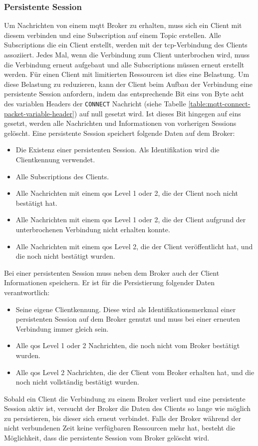 \subsubsection{Persistente Session} \label{s:persistent-session}
Um Nachrichten von einem \ac{mqtt} Broker zu erhalten, muss sich ein Client mit diesem verbinden und eine Subscription auf einem Topic erstellen. Alle Subscriptions die ein Client erstellt, werden mit der \ac{tcp}-Verbindung des Clients assoziiert.
Jedes Mal, wenn die Verbindung zum Client unterbrochen wird, muss die Verbindung erneut aufgebaut und alle Subscriptions müssen erneut erstellt werden.
Für einen Client mit limitierten Ressourcen ist dies eine Belastung.
Um diese Belastung zu reduzieren, kann der Client beim Aufbau der Verbindung eine persistente Session anfordern, indem das entsprechende Bit eins von Byte acht des variablen Headers der \verb|CONNECT| Nachricht (siehe Tabelle \ref{table:mqtt-connect-packet-variable-header}) auf null gesetzt wird.
Ist dieses Bit hingegen auf eins gesetzt, werden alle Nachrichten und Informationen von vorherigen Sessions gelöscht.
Eine persistente Session speichert folgende Daten auf dem Broker:
\begin{itemize}
    \item Die Existenz einer persistenten Session. Als Identifikation wird die Clientkennung verwendet.
    \item Alle Subscriptions des Clients.
    \item Alle Nachrichten mit einem \ac{qos} Level 1 oder 2, die der Client noch nicht bestätigt hat.
    \item Alle Nachrichten mit einem \ac{qos} Level 1 oder 2, die der Client aufgrund der unterbrochenen Verbindung nicht erhalten konnte.
    \item Alle Nachrichten mit einem \ac{qos} Level 2, die der Client veröffentlicht hat, und die noch nicht bestätigt wurden.
\end{itemize}
Bei einer persistenten Session muss neben dem Broker auch der Client Informationen speichern.
Er ist für die Persistierung folgender Daten verantwortlich:
\begin{itemize}
    \item Seine eigene Clientkennung. Diese wird als Identifikationsmerkmal einer persistenten Session auf dem Broker genutzt und muss bei einer erneuten Verbindung immer gleich sein.
    \item Alle \ac{qos} Level 1 oder 2 Nachrichten, die noch nicht vom Broker bestätigt wurden.
    \item Alle \ac{qos} Level 2 Nachrichten, die der Client vom Broker erhalten hat, und die noch nicht vollständig bestätigt wurden.
\end{itemize}
Sobald ein Client die Verbindung zu einem Broker verliert und eine persistente Session aktiv ist, versucht der Broker die Daten des Clients so lange wie möglich zu persistieren, bis dieser sich erneut verbindet.
Falls der Broker während der nicht verbundenen Zeit keine verfügbaren Ressourcen mehr hat, besteht die Möglichkeit, dass die persistente Session vom Broker gelöscht wird.
\cite{teamPersistentSessionQueuing}

